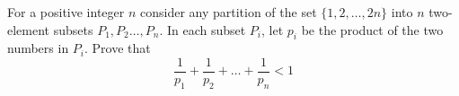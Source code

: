 For a positive integer $n$ consider any partition of the set $\{ 1,2,\ldots ,2n \}$ into $n$ two-element subsets $P_1,P_2\ldots,P_n$. In each subset $P_i$,  let $p_i$ be the product of the two numbers in $P_i$. Prove that\[\frac{1}{p_1}+\frac{1}{p_2}+\ldots + \frac{1}{p_n}<1 \]